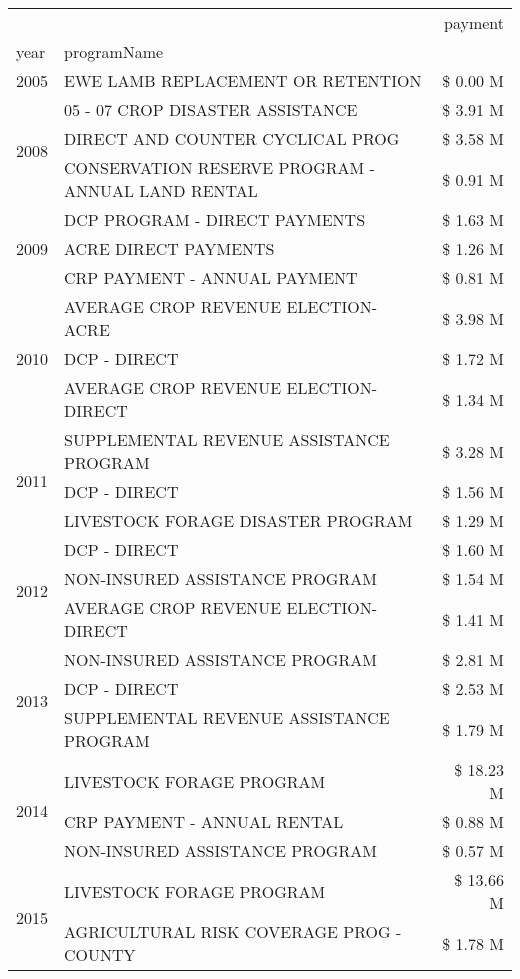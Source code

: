 \begin{tabular}{llr}
\toprule
 &  & payment \\
year & programName &  \\
\midrule
2005 & EWE LAMB REPLACEMENT OR RETENTION & \$ 0.00 M \\
\cline{1-3}
\multirow[t]{3}{*}{2008} & 05 - 07 CROP DISASTER ASSISTANCE & \$ 3.91 M \\
 & DIRECT AND COUNTER CYCLICAL PROG & \$ 3.58 M \\
 & CONSERVATION RESERVE PROGRAM - ANNUAL LAND RENTAL & \$ 0.91 M \\
\cline{1-3}
\multirow[t]{3}{*}{2009} & DCP PROGRAM - DIRECT PAYMENTS & \$ 1.63 M \\
 & ACRE DIRECT PAYMENTS & \$ 1.26 M \\
 & CRP PAYMENT - ANNUAL PAYMENT & \$ 0.81 M \\
\cline{1-3}
\multirow[t]{3}{*}{2010} & AVERAGE CROP REVENUE ELECTION-ACRE & \$ 3.98 M \\
 & DCP - DIRECT & \$ 1.72 M \\
 & AVERAGE CROP REVENUE ELECTION-DIRECT & \$ 1.34 M \\
\cline{1-3}
\multirow[t]{3}{*}{2011} & SUPPLEMENTAL REVENUE ASSISTANCE PROGRAM & \$ 3.28 M \\
 & DCP - DIRECT & \$ 1.56 M \\
 & LIVESTOCK FORAGE DISASTER PROGRAM & \$ 1.29 M \\
\cline{1-3}
\multirow[t]{3}{*}{2012} & DCP - DIRECT & \$ 1.60 M \\
 & NON-INSURED ASSISTANCE PROGRAM & \$ 1.54 M \\
 & AVERAGE CROP REVENUE ELECTION-DIRECT & \$ 1.41 M \\
\cline{1-3}
\multirow[t]{3}{*}{2013} & NON-INSURED ASSISTANCE PROGRAM & \$ 2.81 M \\
 & DCP - DIRECT & \$ 2.53 M \\
 & SUPPLEMENTAL REVENUE ASSISTANCE PROGRAM & \$ 1.79 M \\
\cline{1-3}
\multirow[t]{3}{*}{2014} & LIVESTOCK FORAGE PROGRAM & \$ 18.23 M \\
 & CRP PAYMENT - ANNUAL RENTAL & \$ 0.88 M \\
 & NON-INSURED ASSISTANCE PROGRAM & \$ 0.57 M \\
\cline{1-3}
\multirow[t]{3}{*}{2015} & LIVESTOCK FORAGE PROGRAM & \$ 13.66 M \\
 & AGRICULTURAL RISK COVERAGE PROG - COUNTY & \$ 1.78 M \\

\end{tabular}

